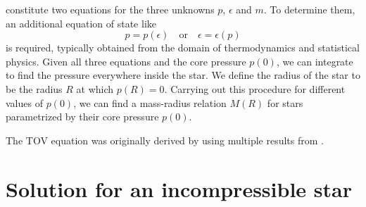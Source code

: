  constitute two equations for the three unknowns $p$, $\epsilon$ and $m$.
To determine them, an additional equation of state like
\begin{equation}
	p = p(\epsilon)
	\quad \text{or} \quad
	\epsilon = \epsilon(p)
\end{equation}
is required, typically obtained from the domain of thermodynamics and statistical physics.
Given all three equations and the core pressure $p(0)$, we can integrate to find the pressure everywhere inside the star.
We define the radius of the star to be the radius $R$ at which $p(R) = 0$.
Carrying out this procedure for different values of $p(0)$, we can find a mass-radius relation $M(R)$ for stars parametrized by their core pressure $p(0)$.

The TOV equation was originally derived by \cite{ref:tov} using multiple results from \cite{ref:tolman}.

\section{Solution for an incompressible star}
\label{sec:incompressible_star}


